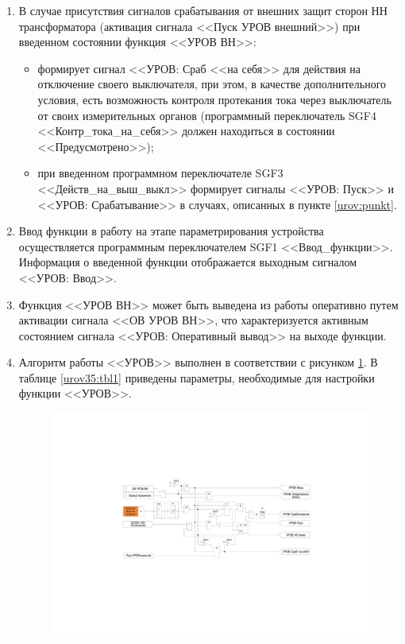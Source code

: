 \documentclass[a4paper, 12pt,table, hidelinks, DIV=calc]{extarticle} %
\begin{document}
\begin{enumerate}[label=\arabic{section}.\arabic{subsection}.\arabic*, labelsep=4pt, leftmargin=0pt, itemindent=57pt]
\begin{itemize}
\end{itemize}
\item
В случае присутствия сигналов срабатывания от внешних защит сторон НН трансформатора (активация сигнала <<Пуск УРОВ внешний>>) при введенном состоянии функция <<УРОВ ВН>>: 
\begin{itemize}
	\item формирует сигнал <<УРОВ: Сраб <<на себя>> для действия на отключение своего выключателя, при этом, в качестве дополнительного условия, есть возможность контроля протекания тока через выключатель от своих измерительных органов (программный переключатель SGF4 <<Контр\_тока\_на\_себя>> должен находиться в состоянии <<Предусмотрено>>);
	\item при введенном программном переключателе SGF3 <<Действ\_на\_выш\_выкл>> формирует сигналы <<УРОВ: Пуск>> и <<УРОВ: Срабатывание>> в случаях, описанных в пункте \ref{urov:punkt}.
\end{itemize}

\item
Ввод функции в работу на этапе параметрирования устройства осуществляется программным переключателем SGF1 <<Ввод\_функции>>. Информация о введенной функции отображается выходным сигналом <<УРОВ: Ввод>>.
\item
Функция <<УРОВ ВН>> может быть выведена из работы оперативно путем активации сигнала <<ОВ УРОВ ВН>>, что характеризуется активным состоянием сигнала <<УРОВ: Оперативный вывод>> на выходе функции.

\item
Алгоритм работы <<УРОВ>> выполнен в соответствии с рисунком \ref{urov35:img1}. В таблице \ref{urov35:tbl1} приведены параметры, необходимые для настройки функции <<УРОВ>>.

\vspace{3mm}
\begin{figure}[!h]
\centering
\includegraphics[width=\textwidth,height=\textheight,keepaspectratio]{img36.pdf}
\label{urov35:img1}
\end{figure}


\end{enumerate}
\end{document}
